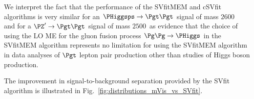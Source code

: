 We interpret the fact that the performance of the SVfitMEM and cSVfit algorithms is very similar for an $\PHiggsps \to \Pgt\Pgt$ signal of mass $2600$~\GeV
and for a $\PZ' \to \Pgt\Pgt$ signal of mass $2500$~\GeV as evidence that the choice of using
the LO ME for the gluon fusion process $\Pg\Pg \to \PHiggs$ in the SVfitMEM algorithm represents no limitation for using
the SVfitMEM algorithm in data analyses of $\Pgt$ lepton pair production other than studies of Higgs boson production.

The improvement in signal-to-background separation provided by the
SVfit algorithm is illustrated in Fig.~\ref{fig:distributions_mVis_vs_SVfit}.

\begin{figure}
\setlength{\unitlength}{1mm}
\begin{center}
\end{center}
\end{figure}
